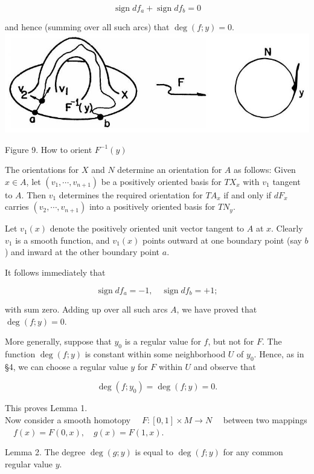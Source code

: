 \documentclass[10pt, letterpaper]{article}
\begin{document}
$$
\operatorname{sign} d f_{a}+\operatorname{sign} d f_{b}=0
$$

and hence (summing over all such arcs) that $\operatorname{deg}(f ; y)=0$.\\
\includegraphics[scale=0.2, center]{2025_05_28_7c9927389b272ddbc2c3g-39}

Figure 9. How to orient $F^{-1}(y)$

The orientations for $X$ and $N$ determine an orientation for $A$ as follows: Given $x \in A$, let $\left(v_{1}, \cdots, v_{n+1}\right)$ be a positively oriented basis for $T X_{x}$ with $v_{1}$ tangent to $A$. Then $v_{1}$ determines the required orientation for $T A_{x}$ if and only if $d F_{x}$ carries $\left(v_{2}, \cdots, v_{n+1}\right)$ into a positively oriented basis for $T N_{y}$.

Let $v_{1}(x)$ denote the positively oriented unit vector tangent to $A$ at $x$. Clearly $v_{1}$ is a smooth function, and $v_{1}(x)$ points outward at one boundary point (say $b$ ) and inward at the other boundary point $a$.

It follows immediately that

$$
\operatorname{sign} d f_{a}=-1, \quad \operatorname{sign} d f_{b}=+1 ;
$$

with sum zero. Adding up over all such arcs $A$, we have proved that $\operatorname{deg}(f ; y)=0$.

More generally, suppose that $y_{0}$ is a regular value for $f$, but not for $F$. The function $\operatorname{deg}(f ; y)$ is constant within some neighborhood $U$ of $y_{0}$. Hence, as in §4, we can choose a regular value $y$ for $F$ within $U$ and observe that

$$
\operatorname{deg}\left(f ; y_{0}\right)=\operatorname{deg}(f ; y)=0 .
$$

This proves Lemma 1.\\
Now consider a smooth homotopy $\quad F:[0,1] \times M \rightarrow N \quad$ between two mappings $\quad f(x)=F(0, x), \quad g(x)=F(1, x)$.

Lemma 2. The degree $\operatorname{deg}(g ; y)$ is equal to $\operatorname{deg}(f ; y)$ for any common regular value $y$.
\end{document}
